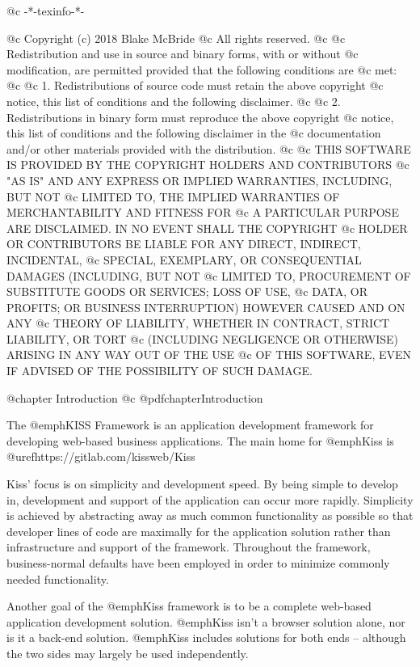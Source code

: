 @c -*-texinfo-*-

@c  Copyright (c) 2018 Blake McBride
@c  All rights reserved.
@c
@c  Redistribution and use in source and binary forms, with or without
@c  modification, are permitted provided that the following conditions are
@c  met:
@c
@c  1. Redistributions of source code must retain the above copyright
@c  notice, this list of conditions and the following disclaimer.
@c
@c  2. Redistributions in binary form must reproduce the above copyright
@c  notice, this list of conditions and the following disclaimer in the
@c  documentation and/or other materials provided with the distribution.
@c
@c  THIS SOFTWARE IS PROVIDED BY THE COPYRIGHT HOLDERS AND CONTRIBUTORS
@c  "AS IS" AND ANY EXPRESS OR IMPLIED WARRANTIES, INCLUDING, BUT NOT
@c  LIMITED TO, THE IMPLIED WARRANTIES OF MERCHANTABILITY AND FITNESS FOR
@c  A PARTICULAR PURPOSE ARE DISCLAIMED. IN NO EVENT SHALL THE COPYRIGHT
@c  HOLDER OR CONTRIBUTORS BE LIABLE FOR ANY DIRECT, INDIRECT, INCIDENTAL,
@c  SPECIAL, EXEMPLARY, OR CONSEQUENTIAL DAMAGES (INCLUDING, BUT NOT
@c  LIMITED TO, PROCUREMENT OF SUBSTITUTE GOODS OR SERVICES; LOSS OF USE,
@c  DATA, OR PROFITS; OR BUSINESS INTERRUPTION) HOWEVER CAUSED AND ON ANY
@c  THEORY OF LIABILITY, WHETHER IN CONTRACT, STRICT LIABILITY, OR TORT
@c  (INCLUDING NEGLIGENCE OR OTHERWISE) ARISING IN ANY WAY OUT OF THE USE
@c  OF THIS SOFTWARE, EVEN IF ADVISED OF THE POSSIBILITY OF SUCH DAMAGE.


@chapter Introduction
@c @pdfchapter{Introduction}

The @emph{KISS Framework} is an application development framework for
developing web-based business applications.  The main home for @emph{Kiss}
is @uref{https://gitlab.com/kissweb/Kiss}


Kiss' focus is on
simplicity and development speed.  By being simple to develop in,
development and support of the application can occur more rapidly.
Simplicity is achieved by abstracting away as much common
functionality as possible so that developer lines of code are
maximally for the application solution rather than infrastructure and
support of the framework.  Throughout the framework, business-normal
defaults have been employed in order to minimize commonly needed
functionality.

Another goal of the @emph{Kiss} framework is to be a complete web-based
application development solution.  @emph{Kiss} isn't a browser solution
alone, nor is it a back-end solution.  @emph{Kiss} includes solutions for
both ends -- although the two sides may largely be used independently.

